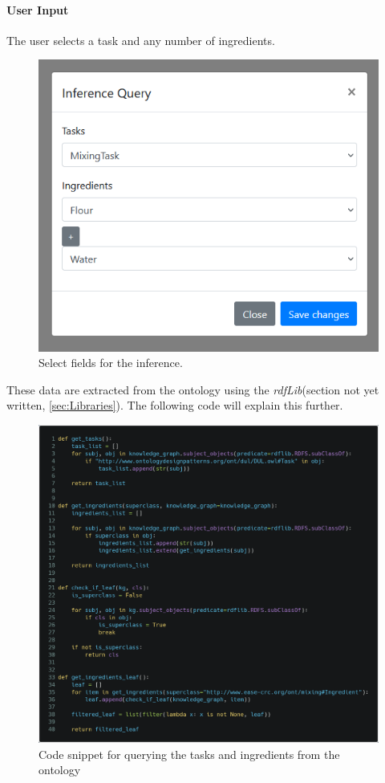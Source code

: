 \paragraph{User Input}

The user selects a task and any number of ingredients.
\begin{figure}[H]
    \includegraphics[scale=0.45]{Graphics/inference_user_input.png}
    \caption{Select fields for the inference.}
\end{figure}
These data are extracted from the ontology using the \textit{rdfLib}(section not yet written, 
\ref{sec:Libraries}). The following code will explain this further.

\begin{figure}[H]
    \includegraphics[scale=0.22]{Graphics/get_tasks_ingredients.png}
    \caption{Code snippet for querying the tasks and ingredients from the ontology}
\end{figure}


